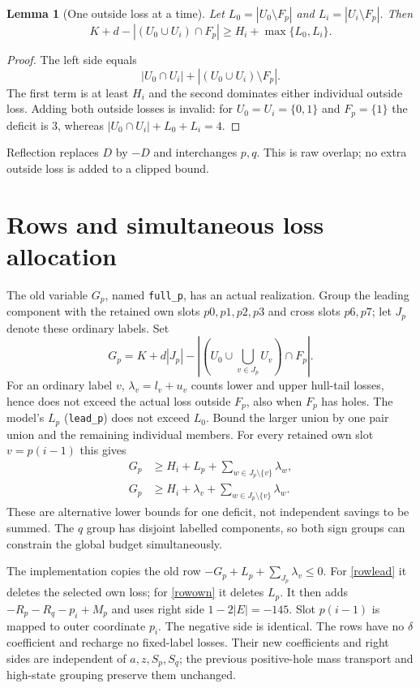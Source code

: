 \documentclass[11pt,a4paper]{article}
\newtheorem{lemma}[theorem]{Lemma}
\begin{document}
\begin{lemma}[One outside loss at a time]\label{outside}
Let $L_0=|U_0\setminus F_p|$ and $L_i=|U_i\setminus F_p|$. Then
\[
 K+d-|(U_0\cup U_i)\cap F_p|\ge H_i+\max\{L_0,L_i\}.
\]
\end{lemma}
\begin{proof}
The left side equals
\[
 |U_0\cap U_i|+|(U_0\cup U_i)\setminus F_p|.
\]
The first term is at least $H_i$ and the second dominates either
individual outside loss. Adding both outside losses is invalid:
for $U_0=U_i=\{0,1\}$ and $F_p=\{1\}$ the deficit is 3,
whereas $|U_0\cap U_i|+L_0+L_i=4$.
\end{proof}
Reflection replaces $D$ by $-D$ and interchanges $p,q$.
This is raw overlap; no extra outside loss is added to a clipped bound.

\section{Rows and simultaneous loss allocation}
The old variable $G_p$, named \texttt{full\_p}, has an actual realization.
Group the leading component with the retained own slots $p0,p1,p2,p3$
and cross slots $p6,p7$; let $J_p$ denote these ordinary labels. Set
\[
 G_p=K+d|J_p|-
 \left|\left(U_0\cup\bigcup_{v\in J_p}U_v\right)\cap F_p\right|.
\]
For an ordinary label $v$, $\lambda_v=l_v+u_v$ counts lower and upper
hull-tail losses, hence does not exceed the actual loss outside $F_p$,
also when $F_p$ has holes. The model's $L_p$ (\texttt{lead\_p}) does not
exceed $L_0$. Bound the larger union by one pair union and the remaining
individual members. For every retained own slot $v=p(i-1)$ this gives
\begin{align}
 G_p&\ge H_i+L_p+\sum_{w\in J_p\setminus\{v\}}\lambda_w,\label{rowlead}\\
 G_p&\ge H_i+\lambda_v+\sum_{w\in J_p\setminus\{v\}}\lambda_w.\label{rowown}
\end{align}
These are alternative lower bounds for one deficit, not independent
savings to be summed. The $q$ group has disjoint labelled components,
so both sign groups can constrain the global budget simultaneously.

The implementation copies the old row
$-G_p+L_p+\sum_{J_p}\lambda_v\le0$.
For \eqref{rowlead} it deletes the selected own loss; for \eqref{rowown}
it deletes $L_p$. It then adds $-R_p-R_q-p_i+M_p$ and uses right side
$1-2|E|=-145$. Slot $p(i-1)$ is mapped to outer coordinate $p_i$.
The negative side is identical. The rows have no $\delta$ coefficient
and recharge no fixed-label losses. Their new coefficients and right
sides are independent of $a,z,S_p,S_q$; the previous positive-hole mass
transport and high-state grouping preserve them unchanged.
\end{document}
